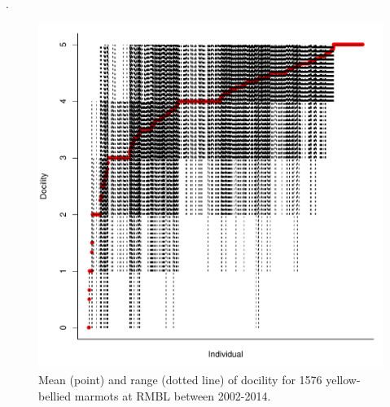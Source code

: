 \documentclass[a4paper,12pt,twoside]{article}
\begin{document}
	\newpage
	.
	\begin{figure}[H]
		\caption{Mean (point) and range (dotted line) of docility for 1576 yellow-bellied marmots at RMBL between 2002-2014.}
		\label{Fig:rawdata}
		\begin{center}
			\includegraphics[width=14cm]{Figind.pdf}
		\end{center}
	\end{figure}
	
\end{document}
